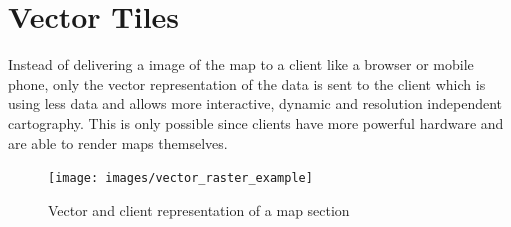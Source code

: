 \section{Vector Tiles}\label{part1_vector_tiles}

Instead of delivering a image of the map to a client like a browser or mobile phone, only the vector representation of the data is sent to the client which is using less data and allows more interactive, dynamic  and resolution independent cartography. This is only possible since clients have more powerful hardware and are able to render maps themselves.

\begin{figure}[H]
\centering
\texttt{[image: images/vector\_raster\_example]}
\caption{Vector and client representation of a map section}
\end{figure}
    


